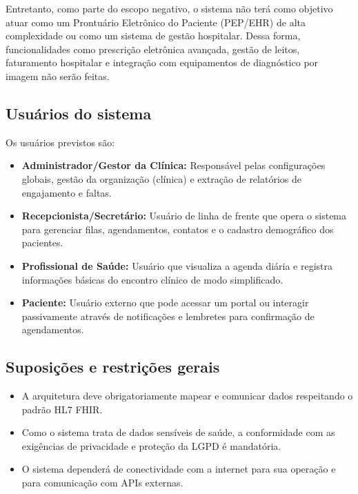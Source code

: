 Entretanto, como parte do escopo negativo, o sistema não terá como objetivo atuar como um Prontuário Eletrônico do Paciente (PEP/EHR) de alta complexidade ou como um sistema de gestão hospitalar. Dessa forma, funcionalidades como prescrição eletrônica avançada, gestão de leitos, faturamento hospitalar e integração com equipamentos de diagnóstico por imagem não serão feitas.

\subsection{Usuários do sistema}
Os usuários previstos são:
\begin{itemize}
    \item \textbf{Administrador/Gestor da Clínica:} Responsável pelas configurações globais, gestão da organização (clínica) e extração de relatórios de engajamento e faltas.
    \item \textbf{Recepcionista/Secretário:} Usuário de linha de frente que opera o sistema para gerenciar filas, agendamentos, contatos e o cadastro demográfico dos pacientes.
    \item \textbf{Profissional de Saúde:} Usuário que visualiza a agenda diária e registra informações básicas do encontro clínico de modo simplificado.
    \item \textbf{Paciente:} Usuário externo que pode acessar um portal ou interagir passivamente através de notificações e lembretes para confirmação de agendamentos.
\end{itemize}

\subsection{Suposições e restrições gerais}
\begin{itemize}
    \item A arquitetura deve obrigatoriamente mapear e comunicar dados respeitando o padrão HL7 FHIR.
    \item Como o sistema trata de dados sensíveis de saúde, a conformidade com as exigências de privacidade e proteção da LGPD é mandatória.
    \item O sistema dependerá de conectividade com a internet para sua operação e para comunicação com APIs externas.
\end{itemize}